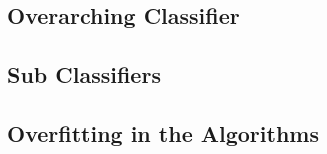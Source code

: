 \documentclass[draftclsnofoot, onecolumn, 10pt, compsoc]{IEEEtran}
\begin{document}
		\subsection{Overarching Classifier}
		
		\subsection{Sub Classifiers}
		
		\subsection{Overfitting in the Algorithms}

		\begin{comment}
			Three possible technologies that could be used to accomplish the different pieces you selected to examine in more detail. Identify these potential technologies even if your client has told you which one to use.
			After conducting research and analyzing trade-offs, identify which technology you have selected for each piece of the project, and why. Convince the reader your analysis is unbiased and well-considered.
		\end{comment}
	
\end{document}
